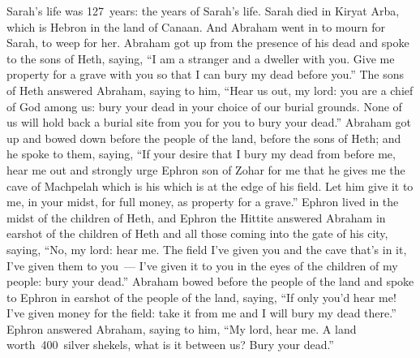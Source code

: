 
\begin{inparaenum}
   Sarah's life was 127~years: the years of Sarah's life.%
   Sarah died in Kiryat Arba, which is Hebron in the land of Canaan. And Abraham went in to mourn for Sarah, to weep for her.%
   Abraham got up from the presence of his dead and spoke to the sons of Heth, saying,%
   ``I am a stranger and a dweller with you. Give me property for a grave with you so that I can bury my dead before you.''%
   The sons of Heth answered Abraham, saying to him,%
   ``Hear us out, my lord: you are a chief of God among us: bury your dead in your choice of our burial grounds. None of us will hold back a burial site from you for you to bury your dead.''%
   Abraham got up and bowed down before the people of the land, before the sons of Heth;%
   and he spoke to them, saying, ``If your desire that I bury my dead from before me, hear me out and strongly urge Ephron son of Zohar for me%
   that he gives me the cave of Machpelah which is his which is at the edge of his field. Let him give it to me, in your midst, for full money, as property for a grave.''%
   Ephron lived in the midst of the children of Heth, and Ephron the Hittite answered Abraham in earshot of the children of Heth and all those coming into the gate of his city, saying,%
   ``No, my lord: hear me. The field I've given you and the cave that's in it, I've given them to you~--- I've given it to you in the eyes of the children of my people: bury your dead.''%
   Abraham bowed before the people of the land%
   and spoke to Ephron in earshot of the people of the land, saying, ``If only you'd hear me! I've given money for the field: take it from me and I will bury my dead there.''%
   Ephron answered Abraham, saying to him,%
   ``My lord, hear me. A land worth\understood{}\ 400~silver shekels, what is it between us? Bury your dead.''%

\end{inparaenum}
